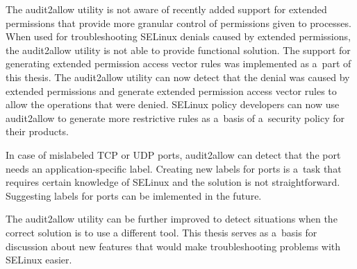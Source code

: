 The audit2allow utility is not aware of recently added support for extended
permissions that provide more granular control of permissions given to
processes. When used for troubleshooting SELinux denials caused by extended
permissions, the audit2allow utility is not able to provide functional solution.
The support for generating extended permission access vector rules was
implemented as a~part of this thesis. The audit2allow utility can now detect
that the denial was caused by extended permissions and generate extended
permission access vector rules to allow the operations that were denied. SELinux
policy developers can now use audit2allow to generate more restrictive rules as
a~basis of a~security policy for their products.

In case of mislabeled TCP or UDP ports, audit2allow can detect that the port
needs an application-specific label. Creating new labels for ports is a~task
that requires certain knowledge of SELinux and the solution is not
straightforward. Suggesting labels for ports can be imlemented in the future.


The audit2allow utility can be further improved to detect situations when the
correct solution is to use a different tool. This thesis serves as a~basis for
discussion about new features that would make troubleshooting problems with
SELinux easier.
